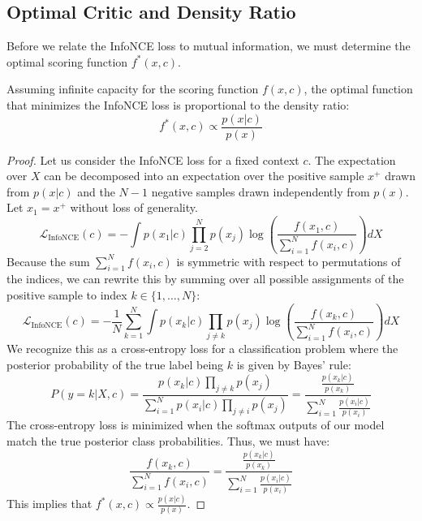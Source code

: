 \subsection{Optimal Critic and Density Ratio}

Before we relate the InfoNCE loss to mutual information, we must determine the optimal scoring function $f^*(x, c)$.

\begin{lemma}
\label{lem:optimal_critic}
Assuming infinite capacity for the scoring function $f(x, c)$, the optimal function that minimizes the InfoNCE loss is proportional to the density ratio:
\begin{equation}
    f^*(x, c) \propto \frac{p(x | c)}{p(x)}
\end{equation}
\end{lemma}

\begin{proof}
Let us consider the InfoNCE loss for a fixed context $c$. The expectation over $X$ can be decomposed into an expectation over the positive sample $x^+$ drawn from $p(x|c)$ and the $N-1$ negative samples drawn independently from $p(x)$. Let $x_1 = x^+$ without loss of generality.
\begin{equation}
    \mathcal{L}_{\text{InfoNCE}}(c) = - \int p(x_1 | c) \prod_{j=2}^N p(x_j) \log \left( \frac{f(x_1, c)}{\sum_{i=1}^N f(x_i, c)} \right) dX
\end{equation}
Because the sum $\sum_{i=1}^N f(x_i, c)$ is symmetric with respect to permutations of the indices, we can rewrite this by summing over all possible assignments of the positive sample to index $k \in \{1, \dots, N\}$:
\begin{equation}
    \mathcal{L}_{\text{InfoNCE}}(c) = - \frac{1}{N} \sum_{k=1}^N \int p(x_k | c) \prod_{j \neq k} p(x_j) \log \left( \frac{f(x_k, c)}{\sum_{i=1}^N f(x_i, c)} \right) dX
\end{equation}
We recognize this as a cross-entropy loss for a classification problem where the posterior probability of the true label being $k$ is given by Bayes' rule:
\begin{equation}
    P(y=k | X, c) = \frac{p(x_k | c) \prod_{j \neq k} p(x_j)}{\sum_{i=1}^N p(x_i | c) \prod_{j \neq i} p(x_j)} = \frac{ \frac{p(x_k|c)}{p(x_k)} }{ \sum_{i=1}^N \frac{p(x_i|c)}{p(x_i)} }
\end{equation}
The cross-entropy loss is minimized when the softmax outputs of our model match the true posterior class probabilities. Thus, we must have:
\begin{equation}
    \frac{f(x_k, c)}{\sum_{i=1}^N f(x_i, c)} = \frac{ \frac{p(x_k|c)}{p(x_k)} }{ \sum_{i=1}^N \frac{p(x_i|c)}{p(x_i)} }
\end{equation}
This implies that $f^*(x, c) \propto \frac{p(x|c)}{p(x)}$.
\end{proof}

